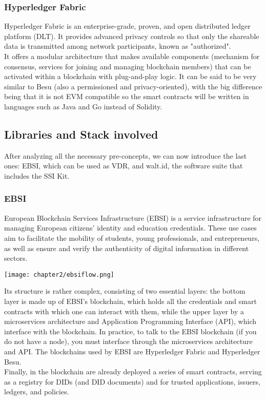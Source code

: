 \subsubsection{Hyperledger Fabric}
Hyperledger Fabric is an enterprise-grade, proven, and open distributed ledger 
platform (DLT). It provides advanced privacy controls so that only the shareable 
data is transmitted among network participants, known as "authorized".\\
It offers a modular architecture that makes available components (mechanism for 
consensus, services for joining and managing blockchain members) that can be activated
within a blockchain with plug-and-play logic. It can be said to be very similar to 
Besu (also a permissioned and privacy-oriented), with the big difference being that 
it is not EVM compatible so the smart contracts will be written in languages such as 
Java and Go instead of Solidity.
\subsection{Libraries and Stack involved}
After analyzing all the necessary pre-concepts, we can now introduce the last ones:
EBSI, which can be used as VDR, and walt.id, the software suite that includes the SSI 
Kit.
\subsubsection{EBSI}
European Blockchain Services Infrastructure (EBSI) is a service infrastructure for 
managing European citizens' identity and education credentials. These use cases aim 
to facilitate the mobility of students, young professionals, and entrepreneurs, as 
well as ensure and verify the authenticity of digital information in different 
sectors.
\begin{center}
    \texttt{[image: chapter2/ebsiflow.png]}
\end{center}
Its structure is rather complex, consisting of two essential layers: the bottom layer 
is made up of EBSI's blockchain, which holds all the credentials and smart contracts 
with which one can interact with them, while the upper layer by a microservices 
architecture and Application Programming Interface (API), which interface with the 
blockchain. In practice, to talk to the EBSI blockchain (if you do not have a node), 
you must interface through the microservices architecture and API. The blockchains
used by EBSI are Hyperledger Fabric and Hyperledger Besu.\\
Finally, in the blockchain are already deployed a series of smart contracts, serving 
as a registry for DIDs (and DID documents) and for trusted applications, issuers, 
ledgers, and policies.
